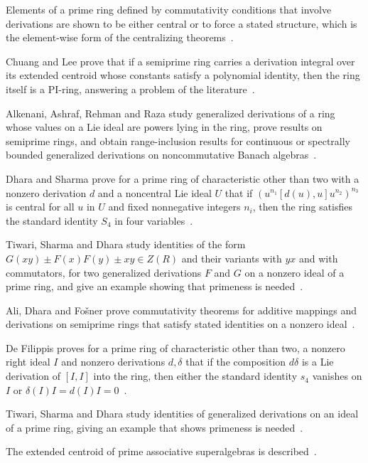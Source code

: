 Elements of a prime ring defined by commutativity conditions that involve derivations are shown to be either central or to force a stated structure, which is the element-wise form of the centralizing theorems~\cite{WlCommutingLikeElementsInPrimeRi2017}.

Chuang and Lee prove that if a semiprime ring carries a derivation integral over its extended centroid whose constants satisfy a polynomial identity, then the ring itself is a PI-ring, answering a problem of the literature~\cite{WlAlgebraicDerivationsWithConsta2003}.

Alkenani, Ashraf, Rehman and Raza study generalized derivations of a ring whose values on a Lie ideal are powers lying in the ring, prove results on semiprime rings, and obtain range-inclusion results for continuous or spectrally bounded generalized derivations on noncommutative Banach algebras~\cite{WlDerivationsWithPowerValuesOnLi2015}.

Dhara and Sharma prove for a prime ring of characteristic other than two with a nonzero derivation $d$ and a noncentral Lie ideal $U$ that if $(u^{n_1}[d(u),u]u^{n_2})^{n_3}$ is central for all $u$ in $U$ and fixed nonnegative integers $n_i$, then the ring satisfies the standard identity $S_4$ in four variables~\cite{WlDerivationsWithPowerCentralVal2008}.

Tiwari, Sharma and Dhara study identities of the form $G(xy)\pm F(x)F(y)\pm xy\in Z(R)$ and their variants with $yx$ and with commutators, for two generalized derivations $F$ and $G$ on a nonzero ideal of a prime ring, and give an example showing that primeness is needed~\cite{WlIdentitiesRelatedToGeneralized2016}.

Ali, Dhara and Fo\v{s}ner prove commutativity theorems for additive mappings and derivations on semiprime rings that satisfy stated identities on a nonzero ideal~\cite{WlSomeCommutativityTheoremsConce2012}.

De Filippis proves for a prime ring of characteristic other than two, a nonzero right ideal $I$ and nonzero derivations $d,\delta$ that if the composition $d\delta$ is a Lie derivation of $[I,I]$ into the ring, then either the standard identity $s_4$ vanishes on $I$ or $\delta(I)I=d(I)I=0$~\cite{WlProductsOfDerivationsWhichActA2006}.

Tiwari, Sharma and Dhara study identities of generalized derivations on an ideal of a prime ring, giving an example that shows primeness is needed~\cite{WlIdentitiesRelatedToGeneralized2020}.

The extended centroid of prime associative superalgebras is described~\cite{WlOnTheExtendedCentroidOfPrimeAs2020}.

